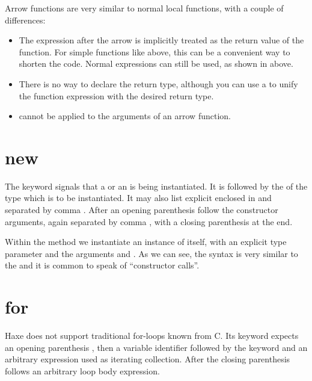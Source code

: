 
Arrow functions are very similar to normal local functions, with a couple of differences:

\begin{itemize}
	\item The expression after the arrow is implicitly treated as the return value of the function. For simple functions like  above, this can be a convenient way to shorten the code. Normal  expressions can still be used, as shown in  above.
	\item There is no way to declare the return type, although you can use a  to unify the function expression with the desired return type.
	\item {} cannot be applied to the arguments of an arrow function.
\end{itemize}


\section{new}
\label{expression-new}

The  keyword signals that a  or an  is being instantiated. It is followed by the  of the type which is to be instantiated. It may also list explicit  enclosed in \expr{<>} and separated by comma \expr{,}. After an opening parenthesis \expr{(} follow the constructor arguments, again separated by comma \expr{,}, with a closing parenthesis \expr{)} at the end.


Within the  method we instantiate an instance of  itself, with an explicit type parameter  and the arguments  and . As we can see, the syntax is very similar to the  and it is common to speak of ``constructor calls''.



\section{for}
\label{expression-for}

Haxe does not support traditional for-loops known from C. Its  keyword expects an opening parenthesis \expr{(}, then a variable identifier followed by the keyword  and an arbitrary expression used as iterating collection. After the closing parenthesis \expr{)} follows an arbitrary loop body expression.

